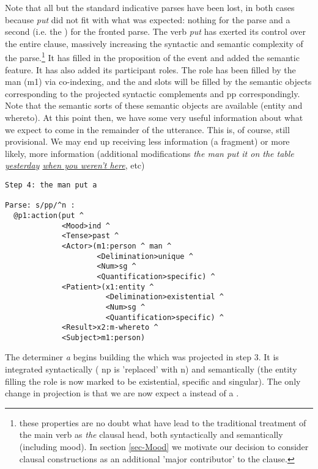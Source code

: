Note that all but the standard indicative parses have been lost, in both cases because \emph{put} did not fit with what was expected: nothing for the   parse and a second  (i.e. the  ) for the fronted parse. The verb \emph{put} has exerted its control over the entire clause, massively increasing the syntactic and semantic complexity of the parse.\footnote{these properties are no doubt what have lead to the traditional treatment of the main verb as \emph{the} clausal head, both syntactically and semantically (including mood). In section \ref{sec-Mood} we motivate our decision to consider clausal constructions as an additional 'major contributor' to the clause.} It has filled in the proposition of the event and added the semantic  feature. It has also added its participant roles. The  role has been filled by the man (m1) via co-indexing, and the  and  slots will be filled by the semantic objects corresponding to the projected syntactic complements  and {\fwdsl{}pp} correspondingly. Note that the semantic sorts of these semantic objects are available (entity and whereto). At this point then, we have some very useful information about what we expect to come in the remainder of the utterance. This is, of course, still provisional. We may end up receiving less information (a fragment) or more likely, more information (additional modifications \emph{the man put it on the table \underline{yesterday} \underline{when you weren't here}}, etc)
\begin{verbatim}
Step 4: the man put a

Parse: s/pp/^n : 
  @p1:action(put ^ 
             <Mood>ind ^ 
             <Tense>past ^ 
             <Actor>(m1:person ^ man ^ 
                     <Delimination>unique ^ 
                     <Num>sg ^ 
                     <Quantification>specific) ^ 
             <Patient>(x1:entity ^ 
                       <Delimination>existential ^ 
                       <Num>sg ^ 
                       <Quantification>specific) ^ 
             <Result>x2:m-whereto ^ 
             <Subject>m1:person)
\end{verbatim}
The determiner \emph{a} begins building the  which was projected in step 3. It is integrated syntactically ( {\fwdsl{}np} is 'replaced' with  {\fwdsl{\wedge}n}) and semantically (the entity filling the  role is now marked to be existential, specific and singular). The only change in projection is that we are now expect a  instead of a .
